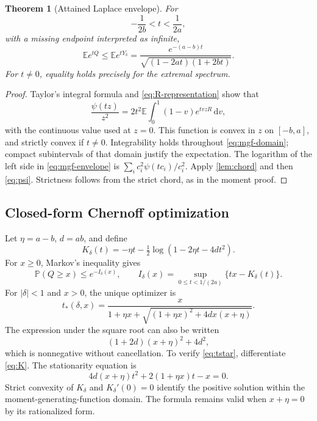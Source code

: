 \documentclass[11pt]{article}
\numberwithin{equation}{section}
\newtheorem{theorem}{Theorem}[section]
\theoremstyle{definition}
\theoremstyle{remark}
\newcommand{\E}{\mathbb E}
\newcommand{\Prob}{\mathbb P}
\newcommand{\dd}{\,\mathrm d}
\begin{document}
\begin{theorem}[Attained Laplace envelope]\label{thm:mgf}
For
\begin{equation}\label{eq:mgf-domain}
-\frac1{2b}<t<\frac1{2a},
\end{equation}
with a missing endpoint interpreted as infinite,
\begin{equation}\label{eq:mgf-envelope}
\E e^{tQ}\leq
\E e^{tY_\delta}
=\frac{e^{-(a-b)t}}{\sqrt{(1-2at)(1+2bt)}}.
\end{equation}
For $t\ne0$, equality holds precisely for the extremal spectrum.
\end{theorem}
\begin{proof}
Taylor's integral formula and \eqref{eq:R-representation} show that
\[
\frac{\psi(tz)}{z^2}
=2t^2\E\int_0^1(1-v)e^{tvzR}\dd v,
\]
with the continuous value used at $z=0$. This function is convex in $z$ on $[-b,a]$, and strictly convex if $t\ne0$. Integrability holds throughout \eqref{eq:mgf-domain}; compact subintervals of that domain justify the expectation. The logarithm of the left side in \eqref{eq:mgf-envelope} is
$\sum_i c_i^2\psi(tc_i)/c_i^2$. Apply \cref{lem:chord} and then \eqref{eq:psi}. Strictness follows from the strict chord, as in the moment proof.
\end{proof}

\subsection{Closed-form Chernoff optimization}
Let $\eta=a-b$, $d=ab$, and define
\begin{equation}\label{eq:K}
K_\delta(t)=-\eta t-\tfrac12\log(1-2\eta t-4dt^2).
\end{equation}
For $x\geq0$, Markov's inequality gives
\begin{equation}\label{eq:chernoff}
\Prob(Q\geq x)\leq e^{-I_\delta(x)},\qquad
I_\delta(x)=\sup_{0\leq t<1/(2a)}\{tx-K_\delta(t)\}.
\end{equation}
For $|\delta|<1$ and $x>0$, the unique optimizer is
\begin{equation}\label{eq:tstar}
t_*(\delta,x)=
\frac{x}{1+\eta x+\sqrt{(1+\eta x)^2+4dx(x+\eta)}}.
\end{equation}
The expression under the square root can also be written
\begin{equation}\label{eq:disc}
(1+2d)(x+\eta)^2+4d^2,
\end{equation}
which is nonnegative without cancellation. To verify \eqref{eq:tstar}, differentiate \eqref{eq:K}. The stationarity equation is
\begin{equation}\label{eq:saddle}
4d(x+\eta)t^2+2(1+\eta x)t-x=0.
\end{equation}
Strict convexity of $K_\delta$ and $K_\delta'(0)=0$ identify the positive solution within the moment-generating-function domain. The formula remains valid when $x+\eta=0$ by its rationalized form.
\end{document}
